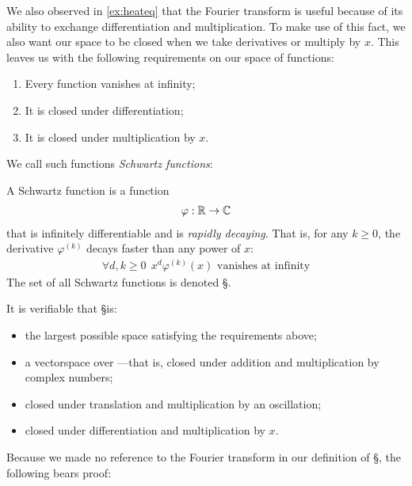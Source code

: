       We also observed in \cref{ex:heateq} that the Fourier transform is useful because of its ability to exchange differentiation and multiplication.
      To make use of this fact, we also want our space to be closed when we take derivatives or multiply by $x$.
      This leaves us with the following requirements on our space of functions:
      \begin{enumerate}[label=(\alph*)]
        \item \label{i:vanish}Every function vanishes at infinity;
        \item \label{i:diff}It is closed under differentiation;
        \item \label{i:mult}It is closed under multiplication by $x$.
      \end{enumerate}
      We call such functions \emph{Schwartz functions}:

      \begin{defn}
        A Schwartz function is a function
        \begin{align*}
          \varphi:\mathbb{R}\rightarrow\mathbb{C}
        \end{align*}
        that is infinitely differentiable and is \emph{rapidly decaying}.
        That is, for any $k\ge0$, the derivative $\varphi^{(k)}$ decays faster than any power of $x$:
        \begin{align*}
          \forall d,k\ge0\ \ x^d\varphi^{(k)}(x)\text{ vanishes at infinity}
        \end{align*}
        The set of all Schwartz functions is denoted \S.
      \end{defn}
      It is verifiable that \S is:
      \begin{itemize}
        \item the largest possible space satisfying the requirements above;
        \item a vectorspace over \C---that is, closed under addition and multiplication by complex numbers;
        \item closed under translation and multiplication by an oscillation;
        \item closed under differentiation and multiplication by $x$.
      \end{itemize}

      Because we made no reference to the Fourier transform in our definition of \S, the following bears proof:

